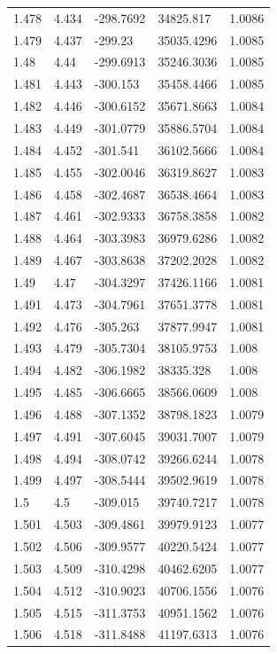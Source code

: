 \begin{tabular}{lllll}
1.478 & 4.434 & -298.7692 & 34825.817 & 1.0086 \\
1.479 & 4.437 & -299.23 & 35035.4296 & 1.0085 \\
1.48 & 4.44 & -299.6913 & 35246.3036 & 1.0085 \\
1.481 & 4.443 & -300.153 & 35458.4466 & 1.0085 \\
1.482 & 4.446 & -300.6152 & 35671.8663 & 1.0084 \\
1.483 & 4.449 & -301.0779 & 35886.5704 & 1.0084 \\
1.484 & 4.452 & -301.541 & 36102.5666 & 1.0084 \\
1.485 & 4.455 & -302.0046 & 36319.8627 & 1.0083 \\
1.486 & 4.458 & -302.4687 & 36538.4664 & 1.0083 \\
1.487 & 4.461 & -302.9333 & 36758.3858 & 1.0082 \\
1.488 & 4.464 & -303.3983 & 36979.6286 & 1.0082 \\
1.489 & 4.467 & -303.8638 & 37202.2028 & 1.0082 \\
1.49 & 4.47 & -304.3297 & 37426.1166 & 1.0081 \\
1.491 & 4.473 & -304.7961 & 37651.3778 & 1.0081 \\
1.492 & 4.476 & -305.263 & 37877.9947 & 1.0081 \\
1.493 & 4.479 & -305.7304 & 38105.9753 & 1.008 \\
1.494 & 4.482 & -306.1982 & 38335.328 & 1.008 \\
1.495 & 4.485 & -306.6665 & 38566.0609 & 1.008 \\
1.496 & 4.488 & -307.1352 & 38798.1823 & 1.0079 \\
1.497 & 4.491 & -307.6045 & 39031.7007 & 1.0079 \\
1.498 & 4.494 & -308.0742 & 39266.6244 & 1.0078 \\
1.499 & 4.497 & -308.5444 & 39502.9619 & 1.0078 \\
1.5 & 4.5 & -309.015 & 39740.7217 & 1.0078 \\
1.501 & 4.503 & -309.4861 & 39979.9123 & 1.0077 \\
1.502 & 4.506 & -309.9577 & 40220.5424 & 1.0077 \\
1.503 & 4.509 & -310.4298 & 40462.6205 & 1.0077 \\
1.504 & 4.512 & -310.9023 & 40706.1556 & 1.0076 \\
1.505 & 4.515 & -311.3753 & 40951.1562 & 1.0076 \\
1.506 & 4.518 & -311.8488 & 41197.6313 & 1.0076 \\

\end{tabular}
